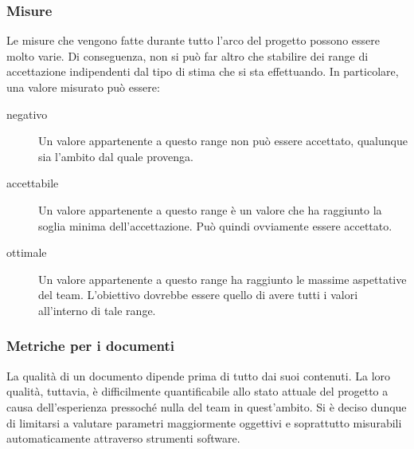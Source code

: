 			\subsubsection{Misure}
				Le misure che vengono fatte durante tutto l'arco del progetto possono essere molto varie. Di conseguenza, non si può far altro che 
				stabilire dei range di accettazione indipendenti dal tipo di stima che si sta effettuando. In particolare, una valore misurato può 
				essere:
				\begin{description}
					\item[negativo] Un valore appartenente a questo range non può essere accettato, qualunque sia l'ambito dal quale provenga.
					\item[accettabile] Un valore appartenente a questo range è un valore che ha raggiunto la soglia minima dell'accettazione. Può 
					quindi ovviamente essere accettato.
					\item[ottimale] Un valore appartenente a questo range ha raggiunto le massime aspettative del team. L'obiettivo dovrebbe essere 
					quello di avere tutti i valori all'interno di tale range.
				\end{description}
			\subsubsection{Metriche per i documenti}
				La qualità di un documento dipende prima di tutto dai suoi contenuti. La loro qualità, tuttavia, è difficilmente quantificabile allo 
				stato attuale del progetto a causa dell'esperienza pressoché nulla del team in quest'ambito. Si è deciso dunque di limitarsi a valutare 
				parametri maggiormente oggettivi e soprattutto misurabili automaticamente attraverso strumenti software.
